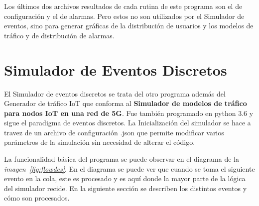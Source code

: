 Los últimos dos archivos resultados de cada rutina de este programa son el de configuración y el de alarmas. Pero estos no son utilizados por el Simulador de eventos, sino para generar gráficas de la distribución de usuarios y los modelos de tráfico y de distribución de alarmas.\newline

\hfill

\break



\section{Simulador de Eventos Discretos}

El Simulador de eventos discretos se trata del otro programa además del Generador de tráfico IoT que conforma al \textbf{Simulador de modelos de tráfico para nodos IoT en una red de 5G}. Fue también programado en python 3.6 y sigue el paradigma de eventos discretos. La Inicialización del simulador se hace a travez de un archivo de configuración .json que permite modificar varios parámetros de la simulación sin necesidad de alterar el código.\newline

La funcionalidad básica del programa se puede observar en el diagrama de la \textit{imagen~\ref{fig:flowdes}}. En el diagrama se puede ver que cuando se toma el siguiente evento en la cola, este es procesado y es aquí donde la mayor parte de la lógica del simulador recide. En la siguiente sección se describen los distintos eventos y cómo son procesados.\newline

